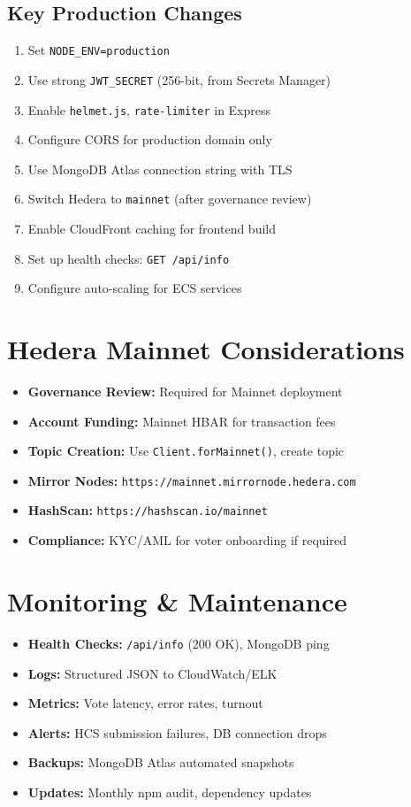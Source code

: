 \subsection{Key Production Changes}
\begin{enumerate}
    \item Set \texttt{NODE\_ENV=production}
    \item Use strong \texttt{JWT\_SECRET} (256-bit, from Secrets Manager)
    \item Enable \texttt{helmet.js}, \texttt{rate-limiter} in Express
    \item Configure CORS for production domain only
    \item Use MongoDB Atlas connection string with TLS
    \item Switch Hedera to \texttt{mainnet} (after governance review)
    \item Enable CloudFront caching for frontend build
    \item Set up health checks: \texttt{GET /api/info}
    \item Configure auto-scaling for ECS services
\end{enumerate}

\section{Hedera Mainnet Considerations}
\label{sec:hedera-mainnet}

\begin{itemize}
    \item \textbf{Governance Review:} Required for Mainnet deployment
    \item \textbf{Account Funding:} Mainnet HBAR for transaction fees
    \item \textbf{Topic Creation:} Use \texttt{Client.forMainnet()}, create topic
    \item \textbf{Mirror Nodes:} \texttt{https://mainnet.mirrornode.hedera.com}
    \item \textbf{HashScan:} \texttt{https://hashscan.io/mainnet}
    \item \textbf{Compliance:} KYC/AML for voter onboarding if required
\end{itemize}

\section{Monitoring \& Maintenance}
\label{sec:monitoring}

\begin{itemize}
    \item \textbf{Health Checks:} \texttt{/api/info} (200 OK), MongoDB ping
    \item \textbf{Logs:} Structured JSON to CloudWatch/ELK
    \item \textbf{Metrics:} Vote latency, error rates, turnout
    \item \textbf{Alerts:} HCS submission failures, DB connection drops
    \item \textbf{Backups:} MongoDB Atlas automated snapshots
    \item \textbf{Updates:} Monthly npm audit, dependency updates
\end{itemize}
